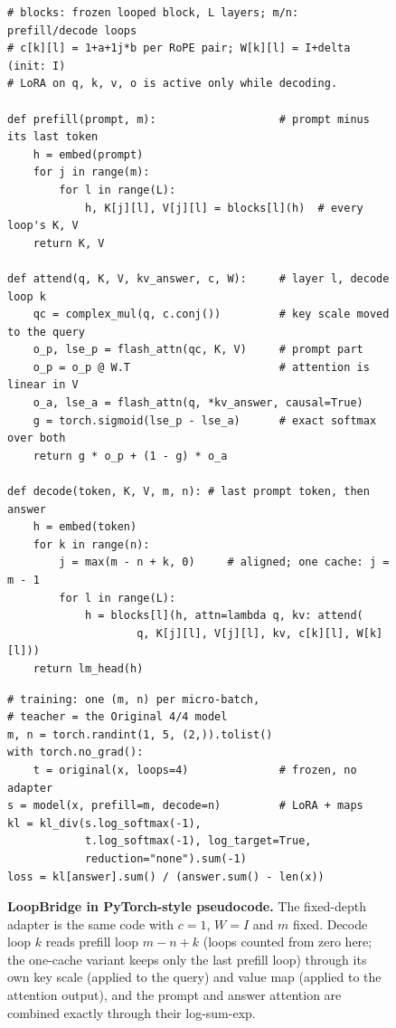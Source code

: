 \documentclass[11pt]{article}
\begin{document}
\begin{figure}[t]
\centering
\begin{minipage}[t]{0.555\textwidth}
\begin{lstlisting}
# blocks: frozen looped block, L layers; m/n: prefill/decode loops
# c[k][l] = 1+a+1j*b per RoPE pair; W[k][l] = I+delta (init: I)
# LoRA on q, k, v, o is active only while decoding.

def prefill(prompt, m):                   # prompt minus its last token
    h = embed(prompt)
    for j in range(m):
        for l in range(L):
            h, K[j][l], V[j][l] = blocks[l](h)  # every loop's K, V
    return K, V

def attend(q, K, V, kv_answer, c, W):     # layer l, decode loop k
    qc = complex_mul(q, c.conj())         # key scale moved to the query
    o_p, lse_p = flash_attn(qc, K, V)     # prompt part
    o_p = o_p @ W.T                       # attention is linear in V
    o_a, lse_a = flash_attn(q, *kv_answer, causal=True)
    g = torch.sigmoid(lse_p - lse_a)      # exact softmax over both
    return g * o_p + (1 - g) * o_a

def decode(token, K, V, m, n): # last prompt token, then answer
    h = embed(token)
    for k in range(n):
        j = max(m - n + k, 0)     # aligned; one cache: j = m - 1
        for l in range(L):
            h = blocks[l](h, attn=lambda q, kv: attend(
                    q, K[j][l], V[j][l], kv, c[k][l], W[k][l]))
    return lm_head(h)
\end{lstlisting}
\end{minipage}\hfill
\begin{minipage}[t]{0.425\textwidth}
\begin{lstlisting}
# training: one (m, n) per micro-batch,
# teacher = the Original 4/4 model
m, n = torch.randint(1, 5, (2,)).tolist()
with torch.no_grad():
    t = original(x, loops=4)              # frozen, no adapter
s = model(x, prefill=m, decode=n)         # LoRA + maps
kl = kl_div(s.log_softmax(-1),
            t.log_softmax(-1), log_target=True,
            reduction="none").sum(-1)
loss = kl[answer].sum() / (answer.sum() - len(x))
\end{lstlisting}
\end{minipage}
\caption{\textbf{LoopBridge in PyTorch-style pseudocode.} The fixed-depth adapter is the same code with $c=1$, $W=I$ and $m$ fixed. Decode loop $k$ reads prefill loop $m-n+k$ (loops
counted from zero here; the one-cache variant keeps only the last prefill loop) through its own key scale (applied to
the query) and value map
(applied to the attention output), and the prompt and answer attention are combined exactly through their log-sum-exp.}
\label{alg:adapter}
\end{figure}
\end{document}
